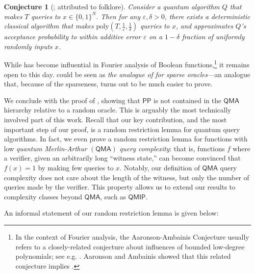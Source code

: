 \documentclass[11pt]{article}%
\newtheorem{conjecture}[theorem]{Conjecture}
\newcommand{\eps}{\varepsilon}
\newcommand{\poly}{\mathrm{poly}}
\begin{document}
\begin{conjecture}[{\cite[Conjecture 1.5]{AA14}; attributed to folklore}]
\label{conj:aaronson_ambainis}
Consider a quantum algorithm $Q$ that makes $T$ queries to $x \in \{0,1\}^N$. Then for any $\eps, \delta > 0$, there exists a deterministic classical algorithm that makes $\poly\left(T, \frac{1}{\eps}, \frac{1}{\delta}\right)$ queries to $x$, and approximates $Q$'s acceptance probability to within additive error $\eps$ on a $1 - \delta$ fraction of uniformly randomly inputs $x$.
\end{conjecture}

While  has become influential in Fourier analysis of Boolean functions,\footnote{In the context of Fourier analysis, the Aaronson-Ambainis Conjecture usually refers to a closely-related conjecture about influences of bounded low-degree polynomials; see e.g. \cite{Mon12,OZ16}. Aaronson and Ambainis \cite{AA14} showed that this related conjecture implies .} it remains open to this day.  could be seen as \textit{the analogue of  for sparse oracles}---an analogue that, because of the sparseness, turns out to be much easier to prove.

\bigskip

We conclude with the proof of , showing that $\mathsf{PP}$ is not contained in the $\mathsf{QMA}$ hierarchy relative to a random oracle. This is arguably the most technically involved part of this work. Recall that our key contribution, and the most important step of our proof, is a random restriction lemma for quantum query algorithms. In fact, we even prove a random restriction lemma for functions with low \emph{quantum Merlin-Arthur $(\mathsf{QMA})$ query complexity}: that is, functions $f$ where a verifier, given an arbitrarily long ``witness state,'' can become convinced that $f(x) = 1$ by making few queries to $x$. Notably, our definition of $\mathsf{QMA}$ query complexity does not care about the length of the witness, but only the number of queries made by the verifier. This property allows us to extend our results to complexity classes beyond $\mathsf{QMA}$, such as $\mathsf{QMIP}$.

An informal statement of our random restriction lemma is given below:
\end{document}
